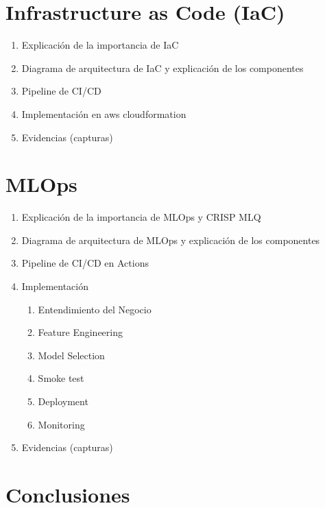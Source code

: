 \section{Infrastructure as Code (IaC)}

\begin{enumerate}
    \item Explicación de la importancia de IaC
    \item Diagrama de arquitectura de IaC y explicación de los componentes
    \item Pipeline de CI/CD
    \item Implementación en aws cloudformation
    \item Evidencias (capturas)
\end{enumerate}


\section{MLOps}

\begin{enumerate}
    \item Explicación de la importancia de MLOps y CRISP MLQ
    \item Diagrama de arquitectura de MLOps y explicación de los componentes
    \item Pipeline de CI/CD en Actions
    \item Implementación
          \begin{enumerate}
              \item Entendimiento del Negocio
              \item Feature Engineering
              \item Model Selection
              \item Smoke test
              \item Deployment
              \item Monitoring
          \end{enumerate}
    \item Evidencias (capturas)
\end{enumerate}

\section{Conclusiones}